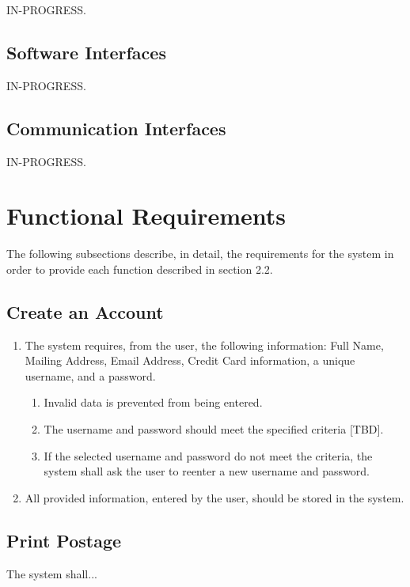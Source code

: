 \documentclass{scrreprt}
\begin{document}
IN-PROGRESS.

\subsection{Software Interfaces}

IN-PROGRESS.

\subsection{Communication Interfaces}

IN-PROGRESS.

\section{Functional Requirements}

The following subsections describe, in detail, the requirements for 
the system in order to provide each function described in section 
2.2.

\subsection{Create an Account}

\begin{enumerate}
\item The system requires, from the user, the following information: Full Name,
Mailing Address, Email Address, Credit Card information, a unique username, and
a password.
\begin{enumerate}
\item Invalid data is prevented from being entered.
\item The username and password should meet the specified criteria [TBD].
\item If the selected username and password do not meet the criteria, the
system shall ask the user to reenter a new username and password.
\end{enumerate}
\item All provided information, entered by the user, should be stored in the
system.
\end{enumerate}

\subsection{Print Postage}

The system shall...
\end{document}
